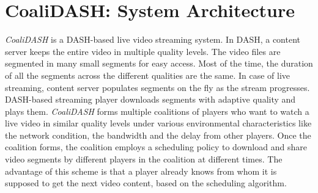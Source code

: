 \section{CoaliDASH: System Architecture}
\label{section:systemDesign}
\textit{CoaliDASH} is a DASH-based live video streaming system. In DASH, a content server keeps the entire video in multiple quality levels. The video files are segmented in many small segments for easy access. Most of the time, the duration of all the segments across the different qualities are the same. In case of live streaming, content server populates segments on the fly as the stream progresses. DASH-based streaming player downloads segments with adaptive quality and plays them.
\textit{CoaliDASH} forms multiple coalitions of players who want to watch a live video in similar quality levels under various environmental characteristics like the network condition, the bandwidth and the delay from other players. Once the coalition forms, the coalition employs a scheduling policy to download and share video segments by different players in the coalition at different times. The advantage of this scheme is that a player already knows from whom it is supposed to get the next video content, based on the scheduling algorithm.  


